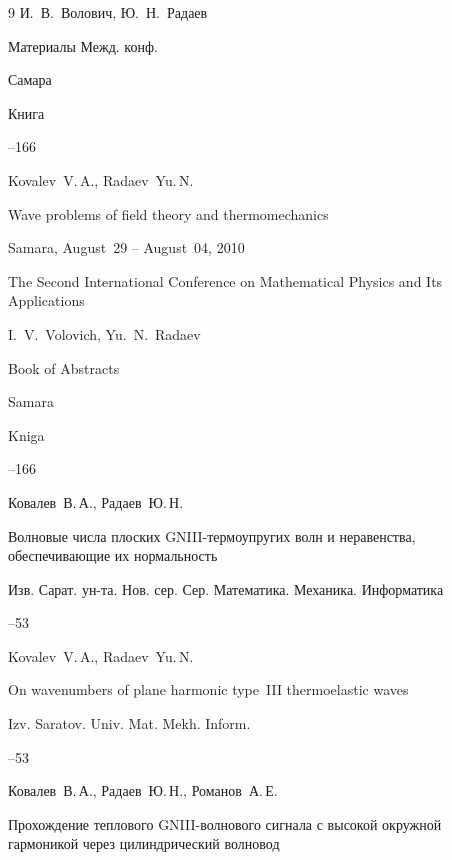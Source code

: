 \begin{thebibliography}{9}
\eds И.~В.~Волович, Ю.~Н.~Радаев

\bookinfo Материалы Межд. конф.


\publaddr Самара

\publ Книга

--166

\misctransl

\by Kovalev~V.\,A., Radaev~Yu.\,N.

\paper Wave problems of field theory and thermomechanics 

\procinfo Samara, August~29 – August~04, 2010

\inbook The Second International Conference on Mathematical Physics and Its Applications

\eds I.~V.~Volovich, Yu.~N.~Radaev

\bookinfo Book of Abstracts


\publaddr Samara

\publ Kniga

--166






\by Ковалев~В.\,А., Радаев~Ю.\,Н.

\paper Волновые числа плоских GNIII-термоупругих волн и неравенства, обеспечивающие их нормальность

\jour Изв. Сарат. ун-та. Нов. сер. Сер. Математика. Механика. Информатика




--53

\misctransl

\by Kovalev~V.\,A., Radaev~Yu.\,N.

\paper On wavenumbers of plane harmonic type~III thermoelastic waves

\jour Izv. Saratov. Univ. Mat. Mekh. Inform.




--53




\by Ковалев~В.\,А., Радаев~Ю.\,Н., Романов~А.\,Е. 

\paper Прохождение теплового GNIII-волнового сигнала с высокой окружной гармоникой через цилиндрический волновод


\end{thebibliography}
